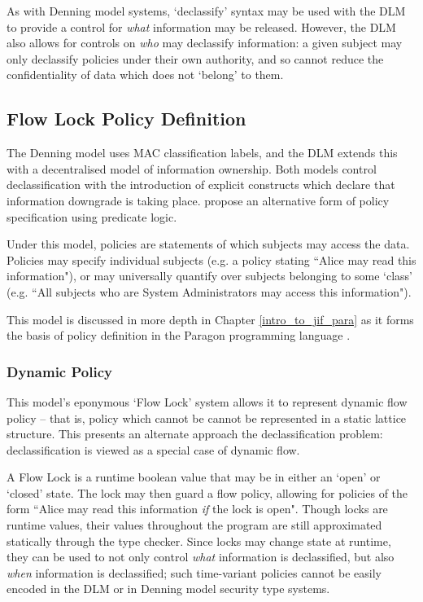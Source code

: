 As with Denning model systems, `declassify' syntax may be used with the DLM to provide a control for \textit{what} information may be released. However, the DLM also allows for controls on \textit{who} may declassify information: a given subject may only declassify policies under their own authority, and so cannot reduce the confidentiality of data which does not `belong' to them.

\subsection{Flow Lock Policy Definition}

The Denning model uses MAC classification labels, and the DLM extends this with a decentralised model of information ownership. Both models control declassification with the introduction of explicit constructs which declare that information downgrade is taking place. \citeauthor{broberg2006flow} \cite{broberg2006flow} propose an alternative form of policy specification using predicate logic.

Under this model, policies are statements of which subjects may access the data. Policies may specify individual subjects (e.g. a policy stating ``Alice may read this information"), or may universally quantify over subjects belonging to some `class' (e.g. ``All subjects who are System Administrators may access this information").

This model is discussed in more depth in Chapter \ref{intro_to_jif_para} as it forms the basis of policy definition in the Paragon programming language \cite{broberg2013paragon}.

\subsubsection{Dynamic Policy}

This model's eponymous `Flow Lock' system allows it to represent dynamic flow policy -- that is, policy which cannot be cannot be represented in a static lattice structure. This presents an alternate approach the declassification problem: declassification is viewed as a special case of dynamic flow.

A Flow Lock is a runtime boolean value that may be in either an `open' or `closed' state. The lock may then guard a flow policy, allowing for policies of the form ``Alice may read this information \textit{if} the lock  is open". Though locks are runtime values, their values throughout the program are still approximated statically through the type checker. Since locks may change state at runtime, they can be used to not only control \textit{what} information is declassified, but also \textit{when} information is declassified; such time-variant policies cannot be easily encoded in the DLM or in Denning model security type systems.

